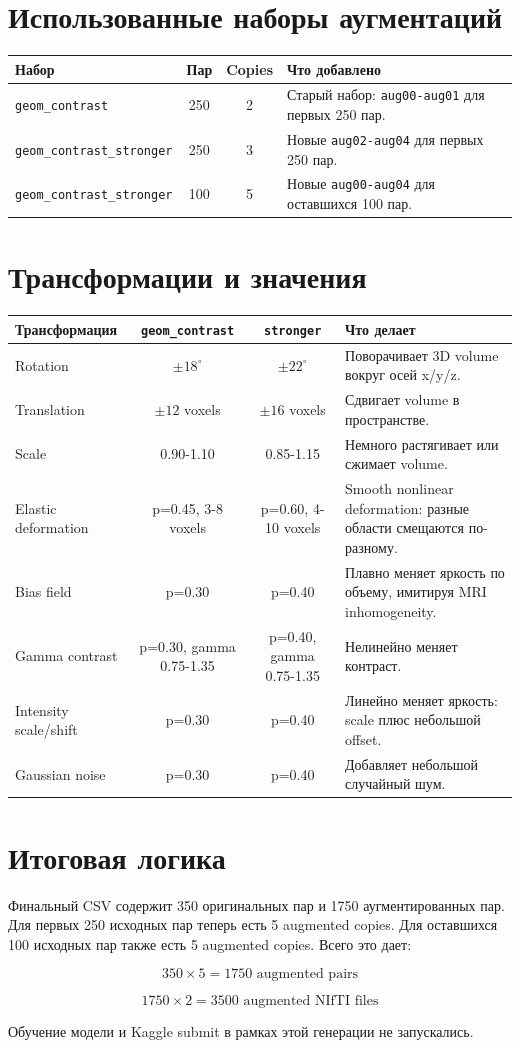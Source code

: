 \documentclass[10pt,a4paper]{article}
\begin{document}
\section*{Использованные наборы аугментаций}

\begin{tabularx}{\linewidth}{@{}lccX@{}}
\toprule
Набор & Пар & Copies & Что добавлено \\
\midrule
\texttt{geom\_contrast} & 250 & 2 & Старый набор: \texttt{aug00-aug01} для первых 250 пар. \\
\texttt{geom\_contrast\_stronger} & 250 & 3 & Новые \texttt{aug02-aug04} для первых 250 пар. \\
\texttt{geom\_contrast\_stronger} & 100 & 5 & Новые \texttt{aug00-aug04} для оставшихся 100 пар. \\
\bottomrule
\end{tabularx}

\section*{Трансформации и значения}

\begin{tabularx}{\linewidth}{@{}lccX@{}}
\toprule
Трансформация & \texttt{geom\_contrast} & \texttt{stronger} & Что делает \\
\midrule
Rotation & $\pm18^\circ$ & $\pm22^\circ$ & Поворачивает 3D volume вокруг осей x/y/z. \\
Translation & $\pm12$ voxels & $\pm16$ voxels & Сдвигает volume в пространстве. \\
Scale & 0.90-1.10 & 0.85-1.15 & Немного растягивает или сжимает volume. \\
Elastic deformation & p=0.45, 3-8 voxels & p=0.60, 4-10 voxels & Smooth nonlinear deformation: разные области смещаются по-разному. \\
Bias field & p=0.30 & p=0.40 & Плавно меняет яркость по объему, имитируя MRI inhomogeneity. \\
Gamma contrast & p=0.30, gamma 0.75-1.35 & p=0.40, gamma 0.75-1.35 & Нелинейно меняет контраст. \\
Intensity scale/shift & p=0.30 & p=0.40 & Линейно меняет яркость: scale плюс небольшой offset. \\
Gaussian noise & p=0.30 & p=0.40 & Добавляет небольшой случайный шум. \\
\bottomrule
\end{tabularx}

\section*{Итоговая логика}

Финальный CSV содержит 350 оригинальных пар и 1750 аугментированных пар.
Для первых 250 исходных пар теперь есть 5 augmented copies. Для оставшихся
100 исходных пар также есть 5 augmented copies. Всего это дает:

\[
350 \times 5 = 1750 \text{ augmented pairs}
\]

\[
1750 \times 2 = 3500 \text{ augmented NIfTI files}
\]

Обучение модели и Kaggle submit в рамках этой генерации не запускались.
\end{document}
